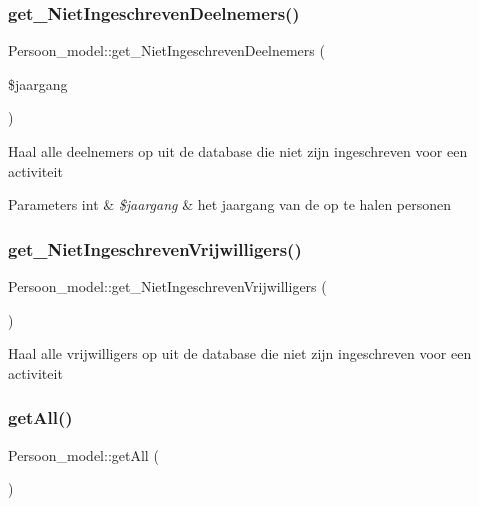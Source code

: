 \subsubsection{\texorpdfstring{get\+\_\+\+Niet\+Ingeschreven\+Deelnemers()}{get\_NietIngeschrevenDeelnemers()}}
{\footnotesize\ttfamily Persoon\+\_\+model\+::get\+\_\+\+Niet\+Ingeschreven\+Deelnemers (\begin{DoxyParamCaption}\item[{}]{\$jaargang }\end{DoxyParamCaption})}

Haal alle deelnemers op uit de database die niet zijn ingeschreven voor een activiteit 
\begin{DoxyParams}[1]{Parameters}
int & {\em \$jaargang} & het jaargang van de op te halen personen \\
\hline
\end{DoxyParams}
\mbox{\label{class_persoon__model_a4402d0963685ffa0de9bba1ec29c4b60}} 
\subsubsection{\texorpdfstring{get\+\_\+\+Niet\+Ingeschreven\+Vrijwilligers()}{get\_NietIngeschrevenVrijwilligers()}}
{\footnotesize\ttfamily Persoon\+\_\+model\+::get\+\_\+\+Niet\+Ingeschreven\+Vrijwilligers (\begin{DoxyParamCaption}{ }\end{DoxyParamCaption})}

Haal alle vrijwilligers op uit de database die niet zijn ingeschreven voor een activiteit \mbox{\label{class_persoon__model_a82a921cf28a86b52a32d48235e30c0f1}} 
\subsubsection{\texorpdfstring{get\+All()}{getAll()}}
{\footnotesize\ttfamily Persoon\+\_\+model\+::get\+All (\begin{DoxyParamCaption}{ }\end{DoxyParamCaption})}

